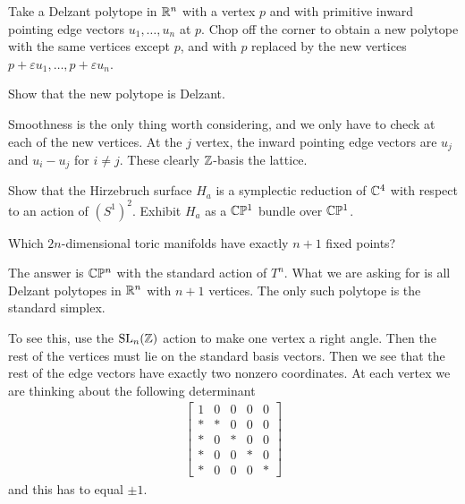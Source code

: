 \documentclass[12pt]{article}
\begin{document}
\begin{example}
	Take a Delzant polytope in $\mathbb{R}^n$ with a vertex $p$ and with primitive inward pointing
	edge vectors $u_1,\dots,u_n$ at $p$. Chop off the corner to obtain a new polytope with the same
	vertices except $p$, and with $p$ replaced by the new vertices $p + \varepsilon u_1,\dots,p + \varepsilon u_n$.

    \hfill

    Show that the new polytope is Delzant.

    \hfill

    Smoothness is the only thing worth considering, and we only have to check at each of the new vertices.
    At the $j$ vertex, the inward pointing edge vectors are $u_j$ and $u_i - u_j$ for $i\neq j$. These clearly $\mathbb{Z}$-basis
    the lattice.
\end{example}

\begin{example}
    Show that the Hirzebruch surface $H_a$ is a symplectic reduction of $\mathbb{C}^4$ with respect to an action of $(S^1)^2$.
    Exhibit $H_a$ as a $\mathbb{C}\mathbb{P}^1$ bundle over $\mathbb{C}\mathbb{P}^1$. 
\end{example}

\begin{example}
    Which $2n$-dimensional toric manifolds have exactly $n+1$ fixed points?

    \hfill

    The answer is $\mathbb{C}\mathbb{P}^n$ with the standard action of $T^n$. What we are asking for is all Delzant polytopes 
    in $\mathbb{R}^n$ with $n+1$ vertices. The only such polytope is the standard simplex.

    \hfill

    To see this, use the $\operatorname{SL}_n(\mathbb{Z})$ action to make one vertex a right angle. Then the rest of the vertices
    must lie on the standard basis vectors. Then we see that the rest of the edge vectors have exactly two nonzero 
    coordinates. At each vertex we are thinking about the following determinant \begin{align*}
        \begin{bmatrix}
            1 & 0 & 0 & 0 & 0 \\
            * & * & 0 & 0 & 0 \\
            * & 0 & * & 0 & 0 \\
            * & 0 & 0 & * & 0 \\
            * & 0 & 0 & 0 & *
        \end{bmatrix}
    \end{align*} and this has to equal $\pm 1$. 
\end{example}
\end{document}
